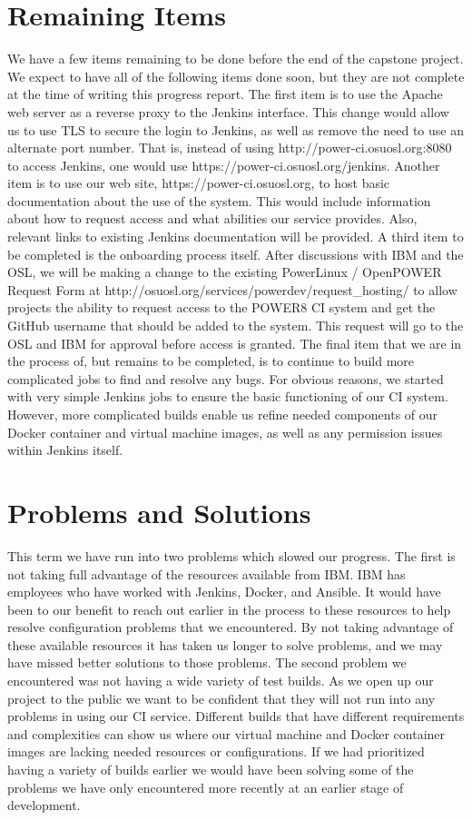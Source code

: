 \documentclass[10pt,onecolumn,journal,draftclsnofoot]{IEEEtran}
\begin{document}
\section{Remaining Items}
We have a few items remaining to be done before the end of the capstone project.
We expect to have all of the following items done soon, but they are not complete at the time of writing this progress report.
The first item is to use the Apache web server as a reverse proxy to the Jenkins interface.
This change would allow us to use TLS to secure the login to Jenkins, as well as remove the need to use an alternate port number. 
That is, instead of using http://power-ci.osuosl.org:8080 to access Jenkins, one would use https://power-ci.osuosl.org/jenkins. 
Another item is to use our web site, https://power-ci.osuosl.org, to host basic documentation about the use of the system.
This would include information about how to request access and what abilities our service provides.
Also, relevant links to existing Jenkins documentation will be provided. 
A third item to be completed is the onboarding process itself. 
After discussions with IBM and the OSL, we will be making a change to the existing PowerLinux / OpenPOWER Request Form at http://osuosl.org/services/powerdev/request\_hosting/ to allow projects the ability to request access to the POWER8 CI system and get the GitHub username that should be added to the system. 
This request will go to the OSL and IBM for approval before access is granted.
The final item that we are in the process of, but remains to be completed, is to continue to build more complicated jobs to find and resolve any bugs.
For obvious reasons, we started with very simple Jenkins jobs to ensure the basic functioning of our CI system.
However, more complicated builds enable us refine needed components of our Docker container and virtual machine images, as well as any permission issues within Jenkins itself.


\section{Problems and Solutions}
This term we have run into two problems which slowed our progress.
The first is not taking full advantage of the resources available from IBM\@.
IBM has employees who have worked with Jenkins, Docker, and Ansible.
It would have been to our benefit to reach out earlier in the process to these resources to help resolve configuration problems that we encountered.
By not taking advantage of these available resources it has taken us longer to solve problems, and we may have missed better solutions to those problems.
The second problem we encountered was not having a wide variety of test builds.
As we open up our project to the public we want to be confident that they will not run into any problems in using our CI service.
Different builds that have different requirements and complexities can show us where our virtual machine and Docker container images are lacking needed resources or configurations. 
If we had prioritized having a variety of builds earlier we would have been solving some of the problems we have only encountered more recently at an earlier stage of development.
\end{document}

